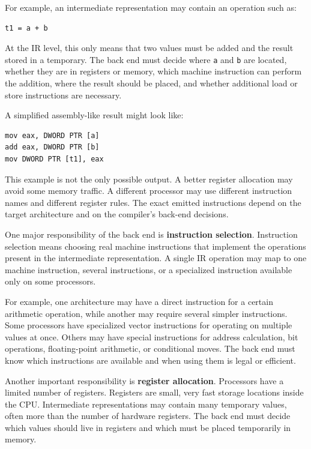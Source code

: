For example, an intermediate representation may contain an operation such as:

\begin{verbatim}
t1 = a + b
\end{verbatim}

At the IR level, this only means that two values must be added and the result stored in a temporary. The back end must decide where \texttt{a} and \texttt{b} are located, whether they are in registers or memory, which machine instruction can perform the addition, where the result should be placed, and whether additional load or store instructions are necessary.

A simplified assembly-like result might look like:

\begin{verbatim}
mov eax, DWORD PTR [a]
add eax, DWORD PTR [b]
mov DWORD PTR [t1], eax
\end{verbatim}

This example is not the only possible output. A better register allocation may avoid some memory traffic. A different processor may use different instruction names and different register rules. The exact emitted instructions depend on the target architecture and on the compiler's back-end decisions.

One major responsibility of the back end is \textbf{instruction selection}. Instruction selection means choosing real machine instructions that implement the operations present in the intermediate representation. A single IR operation may map to one machine instruction, several instructions, or a specialized instruction available only on some processors.

For example, one architecture may have a direct instruction for a certain arithmetic operation, while another may require several simpler instructions. Some processors have specialized vector instructions for operating on multiple values at once. Others may have special instructions for address calculation, bit operations, floating-point arithmetic, or conditional moves. The back end must know which instructions are available and when using them is legal or efficient.

Another important responsibility is \textbf{register allocation}. Processors have a limited number of registers. Registers are small, very fast storage locations inside the CPU. Intermediate representations may contain many temporary values, often more than the number of hardware registers. The back end must decide which values should live in registers and which must be placed temporarily in memory.


